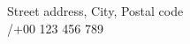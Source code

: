 {\LARGE\bfseries\sendername}\par
\vspace{-3pt}{\small\sffamily\color{accent}\senderrole}\par
\vspace{2pt}
{\small\color{muted}Street address, City, Postal code\\
\href{mailto:\senderemail}{\senderemail}\quad /\quad +00 123 456 789}
\vspace{18pt}

